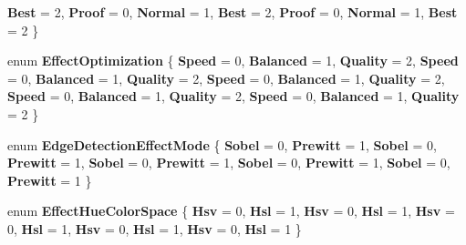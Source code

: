 \begin{DoxyCompactItemize}
{\bfseries Best} = 2, 
{\bfseries Proof} = 0, 
{\bfseries Normal} = 1, 
{\bfseries Best} = 2, 
\newline
{\bfseries Proof} = 0, 
{\bfseries Normal} = 1, 
{\bfseries Best} = 2
 \}
\item 
\mbox{\label{namespace_microsoft_1_1_graphics_1_1_canvas_1_1_effects_abe4426b8577454af68a566839afdea96}} 
enum {\bfseries Effect\+Optimization} \{ \newline
{\bfseries Speed} = 0, 
{\bfseries Balanced} = 1, 
{\bfseries Quality} = 2, 
{\bfseries Speed} = 0, 
\newline
{\bfseries Balanced} = 1, 
{\bfseries Quality} = 2, 
{\bfseries Speed} = 0, 
{\bfseries Balanced} = 1, 
\newline
{\bfseries Quality} = 2, 
{\bfseries Speed} = 0, 
{\bfseries Balanced} = 1, 
{\bfseries Quality} = 2, 
\newline
{\bfseries Speed} = 0, 
{\bfseries Balanced} = 1, 
{\bfseries Quality} = 2
 \}
\item 
\mbox{\label{namespace_microsoft_1_1_graphics_1_1_canvas_1_1_effects_a587bd4a5e7bae1bcbe7620bbf9ac0959}} 
enum {\bfseries Edge\+Detection\+Effect\+Mode} \{ \newline
{\bfseries Sobel} = 0, 
{\bfseries Prewitt} = 1, 
{\bfseries Sobel} = 0, 
{\bfseries Prewitt} = 1, 
\newline
{\bfseries Sobel} = 0, 
{\bfseries Prewitt} = 1, 
{\bfseries Sobel} = 0, 
{\bfseries Prewitt} = 1, 
\newline
{\bfseries Sobel} = 0, 
{\bfseries Prewitt} = 1
 \}
\item 
\mbox{\label{namespace_microsoft_1_1_graphics_1_1_canvas_1_1_effects_ae7299c185ad53a8bf344202e319bf35a}} 
enum {\bfseries Effect\+Hue\+Color\+Space} \{ \newline
{\bfseries Hsv} = 0, 
{\bfseries Hsl} = 1, 
{\bfseries Hsv} = 0, 
{\bfseries Hsl} = 1, 
\newline
{\bfseries Hsv} = 0, 
{\bfseries Hsl} = 1, 
{\bfseries Hsv} = 0, 
{\bfseries Hsl} = 1, 
\newline
{\bfseries Hsv} = 0, 
{\bfseries Hsl} = 1
 \}
\item 
\mbox{\label{namespace_microsoft_1_1_graphics_1_1_canvas_1_1_effects_a41ef1609f91e4fdf47d735886d2d455b}} 

\end{DoxyCompactItemize}
